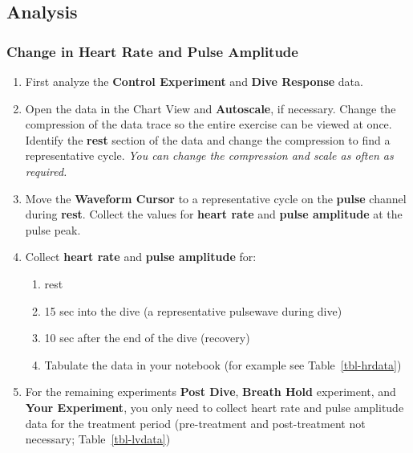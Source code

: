\documentclass[
  letterpaper,
  DIV=11,
  numbers=noendperiod,
  oneside]{scrartcl}
\providecommand{\tightlist}{%
  \setlength{\itemsep}{0pt}\setlength{\parskip}{0pt}}\usepackage{longtable,booktabs,array}
\begin{document}
\hypertarget{analysis-1}{%
\subsection{Analysis}\label{analysis-1}}

\hypertarget{change-in-heart-rate-and-pulse-amplitude}{%
\subsubsection{Change in Heart Rate and Pulse
Amplitude}\label{change-in-heart-rate-and-pulse-amplitude}}

\begin{enumerate}
\def\labelenumi{\arabic{enumi}.}
\tightlist
\item
  First analyze the \textbf{Control Experiment} and \textbf{Dive
  Response} data.
\item
  Open the data in the Chart View and \textbf{Autoscale}, if necessary.
  Change the compression of the data trace so the entire exercise can be
  viewed at once. Identify the \textbf{rest} section of the data and
  change the compression to find a representative cycle. \emph{You can
  change the compression and scale as often as required.}
\item
  Move the \textbf{Waveform Cursor} to a representative cycle on the
  \textbf{pulse} channel during \textbf{rest}. Collect the values for
  \textbf{heart rate} and \textbf{pulse amplitude} at the pulse peak.
\item
  Collect \textbf{heart rate} and \textbf{pulse amplitude} for:

  \begin{enumerate}
  \def\labelenumii{\alph{enumii}.}
  \tightlist
  \item
    rest
  \item
    15 sec into the dive (a representative pulsewave during dive)
  \item
    10 sec after the end of the dive (recovery)
  \item
    Tabulate the data in your notebook (for example see
    Table~\ref{tbl-hrdata})
  \end{enumerate}
\item
  For the remaining experiments \textbf{Post Dive}, \textbf{Breath Hold}
  experiment, and \textbf{Your Experiment}, you only need to collect
  heart rate and pulse amplitude data for the treatment period
  (pre-treatment and post-treatment not necessary;
  Table~\ref{tbl-lvdata})
\end{enumerate}
\end{document}
